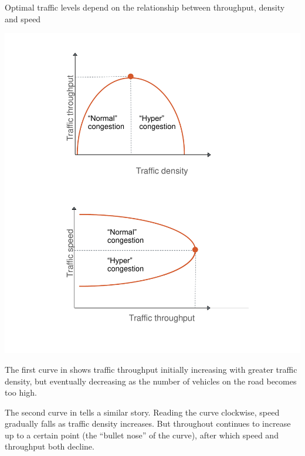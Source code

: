\begin{figureTop}
\caption{Optimal traffic levels depend on the relationship between throughput, density and speed \label{fig:Arnott-flow-curves}}
\includegraphics[page=1]{Charts/ChartPackLong.pdf}
\end{figureTop}

The first curve in  shows traffic throughput initially increasing with greater traffic density, but eventually decreasing as the number of vehicles on the road becomes too high.

The second curve in  tells a similar story.
Reading the curve clockwise, speed gradually falls as traffic density increases.
But throughout continues to increase up to a certain point (the ``bullet nose'' of the curve), after which speed and throughput both decline.

